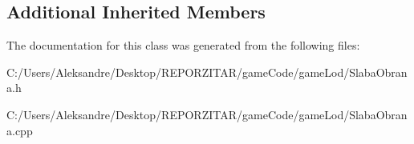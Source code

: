\subsection*{Additional Inherited Members}


The documentation for this class was generated from the following files\+:\begin{DoxyCompactItemize}
\item 
C\+:/\+Users/\+Aleksandre/\+Desktop/\+R\+E\+P\+O\+R\+Z\+I\+T\+A\+R/game\+Code/game\+Lod/Slaba\+Obrana.\+h\item 
C\+:/\+Users/\+Aleksandre/\+Desktop/\+R\+E\+P\+O\+R\+Z\+I\+T\+A\+R/game\+Code/game\+Lod/Slaba\+Obrana.\+cpp\end{DoxyCompactItemize}
